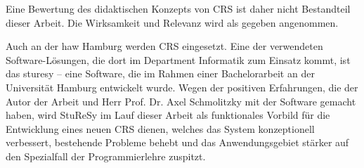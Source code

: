 Eine Bewertung des didaktischen Konzepts von CRS ist daher nicht Bestandteil dieser Arbeit. Die Wirksamkeit und Relevanz wird als gegeben angenommen.

Auch an der \ac{haw} Hamburg werden CRS eingesetzt. Eine der verwendeten Software-Lösungen, die dort im Department Informatik zum Einsatz kommt, ist das \ac{sturesy} – eine Software, die im Rahmen einer Bachelorarbeit an der Universität Hamburg entwickelt wurde\cite{sturesy}. Wegen der positiven Erfahrungen, die der Autor der Arbeit und Herr Prof. Dr. Axel Schmolitzky mit der Software gemacht haben, wird StuReSy im Lauf dieser Arbeit als funktionales Vorbild für die Entwicklung eines neuen CRS dienen, welches das System konzeptionell verbessert, bestehende Probleme behebt und das Anwendungsgebiet stärker auf den Spezialfall der Programmierlehre zuspitzt.